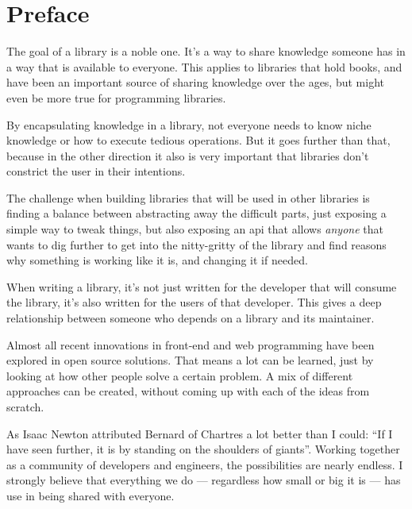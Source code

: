 
\chapter{Preface}%
\label{chp:preface}

The goal of a \gls{library} is a noble one. It's a way to share knowledge someone has in a way that is available to everyone. This applies to libraries that hold books, and have been an important source of sharing knowledge over the ages, but might even be more true for programming libraries. 

By encapsulating knowledge in a \gls{library}, not everyone needs to know niche knowledge or how to execute tedious operations. But it goes further than that, because in the other direction it also is very important that libraries don't constrict the user in their intentions.

The challenge when building libraries that will be used in other libraries is finding a balance between abstracting away the difficult parts, just exposing a simple way to tweak things, but also exposing an \acrshort{api} that allows \emph{anyone} that wants to dig further to get into the nitty-gritty of the \gls{library} and find reasons why something is working like it is, and changing it if needed.

When writing a \gls{library}, it's not just written for the developer that will consume the library, it's also written for the users of that developer. This gives a deep relationship between someone who depends on a \gls{library} and its maintainer.

Almost all recent innovations in front-end and web programming have been explored in open source solutions. That means a lot can be learned, just by looking at how other people solve a certain problem. A mix of different approaches can be created, without coming up with each of the ideas from scratch. 

As Isaac Newton\cite{newton-giants} attributed Bernard of Chartres\cite{quote-giants-source} a lot better than I could: ``If I have seen further, it is by standing on the shoulders of giants''. Working together as a community of developers and engineers, the possibilities are nearly endless. I strongly believe that everything we do --- regardless how small or big it is --- has use in being shared with everyone.
